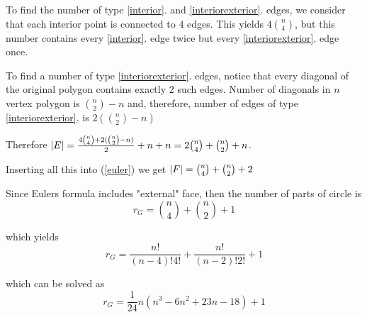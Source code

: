 \begin{problem}
\begin{enumerate}
\end{enumerate}

To find the number of type \ref{interior}. and \ref{interiorexterior}. edges, we consider that each interior point is connected to $4$ edges. This yields $4\binom{n}{4}$, but this number contains every \ref{interior}. edge twice but every \ref{interiorexterior}. edge once.

To find a number of type \ref{interiorexterior}. edges, notice that every diagonal of the original polygon contains exactly $2$ such edges. Number of diagonals in $n$ vertex polygon is $\binom{n}{2}-n$ and, therefore, number of edges of type  \ref{interiorexterior}. is $2(\binom{n}{2}-n)$

Therefore $\lvert E\rvert = \frac{4\binom{n}{4}+2(\binom{n}{2}-n)}{2}+n+n= 2\binom{n}{4}+\binom{n}{2}+n$. 

Inserting all this into (\ref{euler}) we get $\lvert F\rvert=\binom{n}{4} + \binom{n}{2} +2$ 

Since Eulers formula includes "external" face, then the number of parts of circle is
\begin{equation}
r_G=\binom{n}{4} + \binom{n}{2} +1
\end{equation}

which yields 
\begin{equation}
r_G=\frac{n!}{(n-4)! 4!}+\frac{n!}{(n-2)! 2!}+1
\end{equation}

which can be solved as
\begin{equation}
r_G=\frac{1}{24}n(n^3-6n^2+23n-18)+1
\end{equation}

\end{problem}

